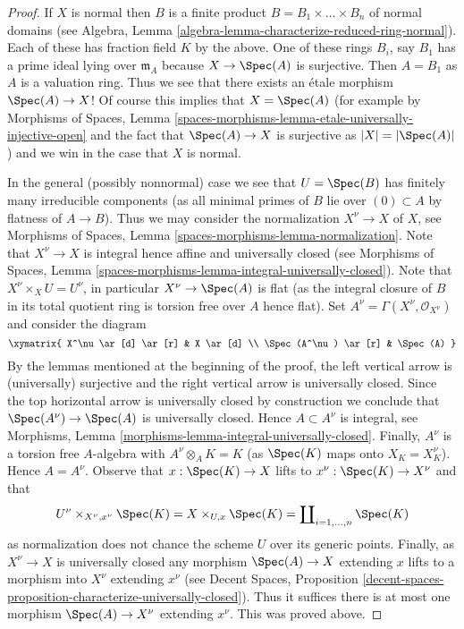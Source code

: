\begin{proof}
\medskip\noindent
If $X$ is normal then $B$ is a finite product
$B = B_1 \times \ldots \times B_n$ of
normal domains (see Algebra, Lemma
\ref{algebra-lemma-characterize-reduced-ring-normal}). Each of
these has fraction field $K$ by the above. 
One of these rings $B_i$, say $B_1$ has a prime ideal lying over
$\mathfrak m_A$ because $X \to \Spec(A)$ is surjective.
Then $A = B_1$ as $A$ is a valuation ring. Thus we see that
there exists an \'etale morphism $\Spec(A) \to X$!
Of course this implies that $X = \Spec(A)$ (for example by
Morphisms of Spaces, Lemma
\ref{spaces-morphisms-lemma-etale-universally-injective-open}
and the fact that $\Spec(A) \to X$ is surjective as $|X| = |\Spec(A)|$)
and we win in the case that $X$ is normal.

\medskip\noindent
In the general (possibly nonnormal) case we see that $U = \Spec(B)$
has finitely many irreducible components (as all minimal primes of $B$
lie over $(0) \subset A$ by flatness of $A \to B$). Thus we may consider
the normalization $X^\nu \to X$ of $X$, see
Morphisms of Spaces, Lemma \ref{spaces-morphisms-lemma-normalization}.
Note that $X^\nu \to X$ is integral hence affine and universally closed (see
Morphisms of Spaces, Lemma
\ref{spaces-morphisms-lemma-integral-universally-closed}).
Note that $X^\nu \times_X U = U^\nu$, in particular $X^\nu \to \Spec(A)$
is flat (as the integral closure of $B$ in its total quotient ring is
torsion free over $A$ hence flat). Set
$A^\nu = \Gamma(X^\nu, \mathcal{O}_{X^\nu})$ and consider the diagram
$$
\xymatrix{
X^\nu \ar[d] \ar[r] & X \ar[d] \\
\Spec(A^\nu) \ar[r] & \Spec(A)
}
$$
By the lemmas mentioned at the beginning of the proof, the left vertical
arrow is (universally) surjective and the right vertical arrow is
universally closed. Since the top horizontal arrow is universally closed by
construction we conclude that $\Spec(A^\nu) \to \Spec(A)$ is
universally closed. Hence $A \subset A^\nu$ is integral, see
Morphisms, Lemma \ref{morphisms-lemma-integral-universally-closed}.
Finally, $A^\nu$ is a torsion free $A$-algebra with $A^\nu \otimes_A K = K$
(as $\Spec(K)$ maps onto $X_K = X^\nu_K$). Hence $A = A^\nu$.
Observe that $x : \Spec(K) \to X$ lifts to $x^\nu : \Spec(K) \to X^\nu$
and that
$$
U^\nu \times_{X^\nu, x^\nu} \Spec(K) =
X \times_{U, x} \Spec(K) =
\coprod\nolimits_{i = 1, \ldots, n} \Spec(K)
$$
as normalization does not chance the scheme $U$ over its generic points.
Finally, as $X^\nu \to X$ is universally closed any morphism
$\Spec(A) \to X$ extending $x$ lifts to a morphism into $X^\nu$
extending $x^\nu$ (see Decent Spaces, Proposition
\ref{decent-spaces-proposition-characterize-universally-closed}).
Thus it suffices there is at most one morphism
$\Spec(A) \to X^\nu$ extending $x^\nu$. This was proved above.
\end{proof}

